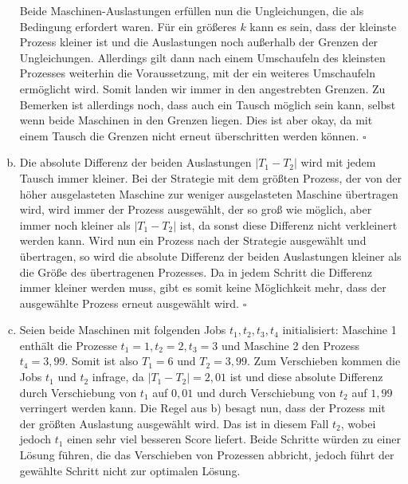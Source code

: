 \documentclass[12pt,a4paper]{article}
\begin{document}
\begin{enumerate}[a)]
		Beide Maschinen-Auslastungen erfüllen nun die Ungleichungen, die als Bedingung erfordert waren. Für ein größeres $k$ kann es sein, dass der kleinste Prozess kleiner ist und die Auslastungen noch außerhalb der Grenzen der Ungleichungen. Allerdings gilt dann nach einem Umschaufeln des kleinsten Prozesses weiterhin die Voraussetzung, mit der ein weiteres Umschaufeln ermöglicht wird. Somit landen wir immer in den angestrebten Grenzen. Zu Bemerken ist allerdings noch, dass auch ein Tausch möglich sein kann, selbst wenn beide Maschinen in den Grenzen liegen. Dies ist aber okay, da mit einem Tausch die Grenzen nicht erneut überschritten werden können. $\square$

	\item Die absolute Differenz der beiden Auslastungen $|T_1 - T_2|$ wird mit jedem Tausch immer kleiner. Bei der Strategie mit dem größten Prozess, der von der höher ausgelasteten Maschine zur weniger ausgelasteten Maschine übertragen wird, wird immer der Prozess ausgewählt, der so groß wie möglich, aber immer noch kleiner als $|T_1 - T_2|$ ist, da sonst diese Differenz nicht verkleinert werden kann. Wird nun ein Prozess nach der Strategie ausgewählt und übertragen, so wird die absolute Differenz der beiden Auslastungen kleiner als die Größe des übertragenen Prozesses. Da in jedem Schritt die Differenz immer kleiner werden muss, gibt es somit keine Möglichkeit mehr, dass der ausgewählte Prozess erneut ausgewählt wird. $\square$
		
	\item Seien beide Maschinen mit folgenden Jobs $t_1, t_2, t_3, t_4$ initialisiert: Maschine 1 enthält die Prozesse $t_1 = 1, t_2 = 2, t_3 = 3$ und Maschine 2 den Prozess $t_4 = 3,99$. Somit ist also $T_1 = 6$ und $T_2 = 3,99$. Zum Verschieben kommen die Jobs $t_1$ und $t_2$ infrage, da $|T_1 - T_2| = 2,01$ ist und diese absolute Differenz durch Verschiebung von $t_1$ auf $0,01$ und durch Verschiebung von $t_2$ auf $1,99$ verringert werden kann. Die Regel aus b) besagt nun, dass der Prozess mit der größten Auslastung ausgewählt wird. Das ist in diesem Fall $t_2$, wobei jedoch $t_1$ einen sehr viel besseren Score liefert. Beide Schritte würden zu einer Lösung führen, die das Verschieben von Prozessen abbricht, jedoch führt der gewählte Schritt nicht zur optimalen Lösung.
		
\end{enumerate}
\end{document}
